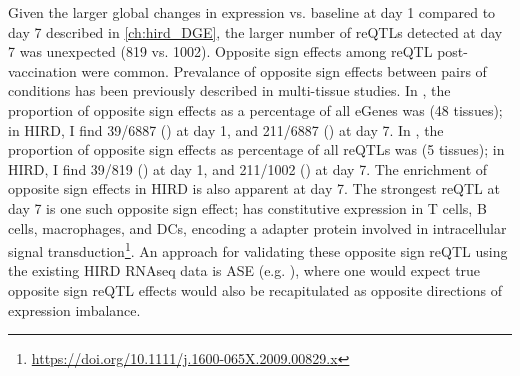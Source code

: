 Given the larger global changes in expression vs. baseline at day 1 compared to day 7 described in \autoref{ch:hird_DGE}, 
the larger number of \glspl{reQTL} detected at day 7 was unexpected (819 vs. 1002).
Opposite sign effects among \gls{reQTL} post-vaccination were common.
Prevalance of opposite sign effects between pairs of conditions has been previously described in multi-tissue studies.
In \autocite{mizuno2019BiologicalCharacterizationExpression}, the proportion of opposite sign effects as a percentage of all eGenes was  (48 tissues);
in \gls{HIRD}, I find
39/6887 () at day 1,
and 211/6887 () at day 7.
In \autocite{fu2012UnravelingRegulatoryMechanisms}, the proportion of opposite sign effects as percentage of all reQTLs was  (5 tissues);
in \gls{HIRD}, I find
39/819 () at day 1,
and 211/1002 () at day 7.
The enrichment of opposite sign effects in \gls{HIRD} is also apparent at day 7.
The strongest reQTL at day 7 is one such opposite sign effect;
 has constitutive expression in T cells, B cells, macrophages, and \glspl{DC}, 
encoding a adapter protein involved in intracellular signal transduction\footnote{\url{https://doi.org/10.1111/j.1600-065X.2009.00829.x}}.
An approach for validating these opposite sign \gls{reQTL} using the existing \gls{HIRD} \gls{RNAseq} data is \gls{ASE} (e.g. \autocite{kumasaka2016FinemappingCellularQTLs}),
where one would expect true opposite sign \gls{reQTL} effects would also be recapitulated as opposite directions of expression imbalance.

